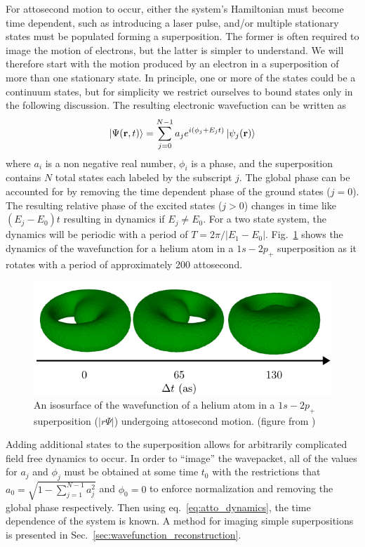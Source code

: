 For attosecond motion to occur, either the system's Hamiltonian must become time dependent, such as introducing a laser pulse, and/or multiple stationary states must be populated forming a superposition. The former is often required to image the motion of electrons, but the latter is simpler to understand. We will therefore start with the motion produced by an electron in a superposition of more than one stationary state. In principle, one or more of the states could be a continuum states, but for simplicity we restrict ourselves to bound states only in the following discussion. The resulting electronic wavefuction can be written as
\begin{equation}
\label{eq:atto_dynamics}
    \ket{\Psi(\mathbf{r},t)} = \sum_{j=0}^{N-1} a_j e^{i(\phi_j +E_jt)}\ket{\psi_j(\mathbf{r})}
\end{equation}
where $a_i$ is a non negative real number, $\phi_i$ is a phase, and the superposition contains $N$ total states each labeled by the subscript $j$. The global phase can be accounted for by removing the time dependent phase of the ground states ($j=0$). The resulting relative phase of the excited states ($j>0$) changes in time like $(E_j-E_0)t$ resulting in dynamics if $E_j\ne E_0$. For a two state system, the dynamics will be periodic with a period of $T=2\pi/|E_1- E_0|$. Fig.~\ref{fig:he_dynamics} shows the dynamics of the wavefunction for a helium atom in a $1s-2p_+$ superposition as it rotates with a period of approximately 200 attosecond. 
\begin{figure}[!ht]
\centering
\includegraphics[width=\columnwidth]{figs/background/dynamics.pdf}
\caption{\label{fig:he_dynamics} An isosurface of the wavefunction of a helium atom in a $1s-2p_+$ superposition ($|r\Psi|$) undergoing attosecond motion. (figure from \cite{venzke2021_wave})
}
\end{figure}
Adding additional states to the superposition allows for arbitrarily complicated field free dynamics to occur. In order to ``image'' the wavepacket, all of the values for $a_j$ and $\phi_j$ must be obtained at some time $t_0$ with the restrictions that $a_0 = \sqrt{1-\sum_{j=1}^{N-1} a_j^2}$ and $\phi_0=0$ to enforce normalization and removing the global phase respectively. Then using eq.~\ref{eq:atto_dynamics}, the time dependence of the system is known. A method for imaging simple superpositions is presented in Sec.~\ref{sec:wavefunction_reconstruction}.

